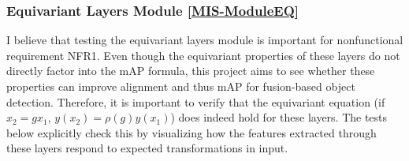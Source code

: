 \documentclass[12pt, titlepage]{article}
\begin{document}
\subsubsection{Equivariant Layers Module \ref{MIS-ModuleEQ}}

I believe that testing the equivariant layers module is important for nonfunctional requirement 
NFR1. Even though the equivariant properties of these layers do not directly factor into the mAP formula, 
this project aims to see whether these properties can improve alignment and thus mAP for fusion-based object detection.
Therefore, it is important to verify that the equivariant equation (if $x_{2}=gx_{1}$, $y(x_{2})=\rho(g)y(x_{1})$) does indeed hold for these layers. 
The tests below explicitly check this by visualizing how the features extracted through these layers respond to 
expected transformations in input.
\end{document}
